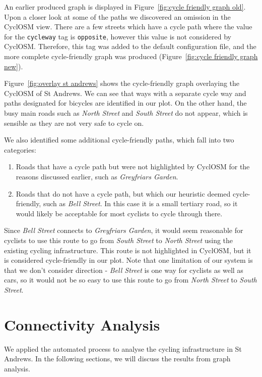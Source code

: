 \documentclass[12pt,a4paper]{report}
\begin{document}
An earlier produced graph is displayed in Figure~\ref{fig:cycle friendly graph old}. Upon a closer look at some of the paths we discovered an omission in the CyclOSM view. There are a few streets which have a cycle path where the value for the \texttt{cycleway} tag is \texttt{opposite}, however this value is not considered by CyclOSM. Therefore, this tag was added to the default configuration file, and the more complete cycle-friendly graph was produced (Figure~\ref{fig:cycle friendly graph new}).

Figure~\ref{fig:overlay st andrews} shows the cycle-friendly graph overlaying the CyclOSM of St Andrews. We can see that ways with a separate cycle way and paths designated for bicycles are identified in our plot. On the other hand, the busy main roads such as \textit{North Street} and \textit{South Street} do not appear, which is sensible as they are not very safe to cycle on. 

We also identified some additional cycle-friendly paths, which fall into two categories: \begin{enumerate}
    \item Roads that have a cycle path but were not highlighted by CyclOSM for the reasons discussed earlier, such as \textit{Greyfriars Garden}.
    \item Roads that do not have a cycle path, but which our heuristic deemed cycle-friendly, such as \textit{Bell Street}. In this case it is a small tertiary road, so it would likely be acceptable for most cyclists to cycle through there.
\end{enumerate}

Since \textit{Bell Street} connects to \textit{Greyfriars Garden}, it would seem reasonable for cyclists to use this route to go from \textit{South Street} to \textit{North Street} using the existing cycling infrastructure. This route is not highlighted in CyclOSM, but it is considered cycle-friendly in our plot. Note that one limitation of our system is that we don't consider direction - \textit{Bell Street} is one way for cyclists as well as cars, so it would not be so easy to use this route to go from \textit{North Street} to \textit{South Street}.

\section{Connectivity Analysis}
We applied the automated process to analyse the cycling infrastructure in St Andrews. In the following sections, we will discuss the results from graph analysis.
\end{document}
